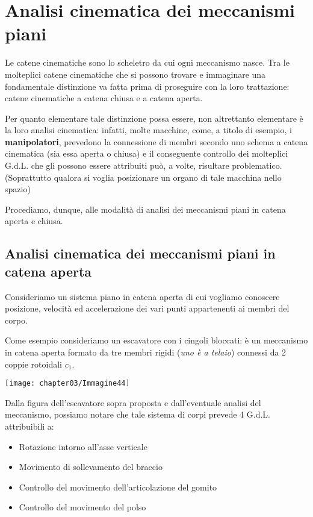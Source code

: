 \chapter{Analisi cinematica dei meccanismi piani}

	
		Le catene cinematiche sono lo scheletro da cui ogni meccanismo nasce. Tra le molteplici catene cinematiche che si possono trovare e immaginare una fondamentale distinzione va fatta  prima di proseguire con la loro trattazione: catene cinematiche a catena chiusa e a catena aperta.
		
		Per quanto elementare tale distinzione possa essere, non altrettanto elementare è la loro analisi cinematica: infatti, molte macchine, come, a titolo di esempio, i \textbf{manipolatori}, prevedono la connessione di membri secondo uno schema a catena cinematica (sia essa aperta o chiusa) e il conseguente controllo dei molteplici G.d.L. che gli possono essere attribuiti può, a volte, risultare problematico. (Soprattutto qualora si voglia posizionare un organo di tale macchina nello spazio)
		
		Procediamo, dunque, alle modalità di analisi dei meccanismi piani in catena aperta e chiusa.
		\section{Analisi cinematica dei meccanismi piani in catena aperta}
			
			\begin{minipage}{.5\textwidth}
				Consideriamo un sistema piano in catena aperta di cui vogliamo conoscere posizione, velocità ed accelerazione dei vari punti appartenenti ai membri del corpo.
			
			Come esempio consideriamo un escavatore con i cingoli bloccati: è un meccanismo in catena aperta formato da tre membri rigidi (\emph{uno è a telaio}) connessi da 2 coppie rotoidali $c_1$.
			\end{minipage}
			\hfill
			\begin{minipage}{.5\textwidth}
				\centering
				\texttt{[image: chapter03/Immagine44]}
			\end{minipage}
			\vspace{1mm}
			
			Dalla figura dell'escavatore sopra proposta e dall'eventuale analisi del meccanismo, possiamo notare che tale sistema di corpi prevede 4 G.d.L. attribuibili a:
			\begin{itemize}
				\item Rotazione intorno all'asse verticale
				\item Movimento di sollevamento del braccio
				\item Controllo del movimento dell'articolazione del gomito
				\item Controllo del movimento del polso
			\end{itemize}
			
